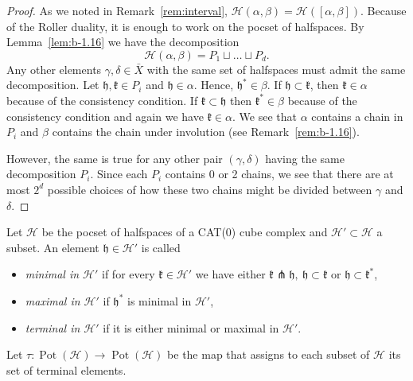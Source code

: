 \begin{proof}
  As we noted in Remark~\ref{rem:interval}, \(\mathcal{H}(\alpha,\beta) = \mathcal{H}([\alpha, \beta])\). Because of the Roller duality, it is enough to work on the pocset of halfspaces. By Lemma~\ref{lem:b-1.16} we have the decomposition
  \[
    \mathcal{H}(\alpha, \beta) = P_1 \sqcup \dots \sqcup P_d.
  \]
  Any other elements \(\gamma, \delta \in \bar X\) with the same set of halfspaces must admit the same decomposition. Let \(\mathfrak{h}, \mathfrak{k} \in P_i\) and \(\mathfrak{h} \in \alpha\). Hence, \(\mathfrak{h}^\ast \in \beta\). If \(\mathfrak{h} \subset \mathfrak{k}\), then \(\mathfrak{k} \in \alpha\) because of the consistency condition. If \(\mathfrak{k} \subset \mathfrak{h}\) then \(\mathfrak{k}^\ast \in \beta\) because of the consistency condition and again we have \(\mathfrak{k} \in \alpha\). We see that \(\alpha\) contains a chain in \(P_i\)  and \(\beta\) contains the chain under involution (see Remark~\ref{rem:b-1.16}).

  However, the same is true for any other pair \((\gamma, \delta)\) having the same decomposition \(P_i\). Since each \(P_i\) contains 0 or 2 chains, we see that there are at most \(2^d\) possible choices of how these two chains might be divided between \(\gamma\) and \(\delta\).
\end{proof}

\begin{defin}
  \label{defin:tau}
  Let \(\mathcal{H}\) be the pocset of halfspaces of a CAT(0) cube complex and \(\mathcal{H}' \subset \mathcal{H}\) a subset. An element \(\mathfrak{h} \in \mathcal{H}'\) is called
  \begin{itemize}
  \item \emph{minimal in \(\mathcal{H}'\)} if for every \(\mathfrak{k} \in \mathcal{H'}\) we have either \(\mathfrak{k} \pitchfork \mathfrak{h},\ \mathfrak{h} \subset \mathfrak{k}\) or \(\mathfrak{h} \subset \mathfrak{k}^\ast\),
  \item \emph{maximal in \(\mathcal{H}'\)} if \(\mathfrak{h}^\ast\) is minimal in \(\mathcal{H}'\),
  \item \emph{terminal in \(\mathcal{H}'\)} if it is either minimal or maximal in \(\mathcal{H}'\).
  \end{itemize}
  Let \(\tau\colon \operatorname{Pot}(\mathcal{H}) \to \operatorname{Pot}(\mathcal{H})\) be the map that assigns to each subset of \(\mathcal{H}\) its set of terminal elements.
\end{defin}

